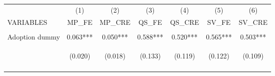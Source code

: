 \begin{center}
\begin{tabular}{lcccccc} \hline
 & (1) & (2) & (3) & (4) & (5) & (6) \\
VARIABLES & MP\_FE & MP\_CRE & QS\_FE & QS\_CRE & SV\_FE & SV\_CRE \\ \hline
\vspace{4pt} & \begin{footnotesize}\end{footnotesize} & \begin{footnotesize}\end{footnotesize} & \begin{footnotesize}\end{footnotesize} & \begin{footnotesize}\end{footnotesize} & \begin{footnotesize}\end{footnotesize} & \begin{footnotesize}\end{footnotesize} \\
Adoption dummy & 0.063*** & 0.050*** & 0.588*** & 0.520*** & 0.565*** & 0.503*** \\
 & \begin{footnotesize}(0.020)\end{footnotesize} & \begin{footnotesize}(0.018)\end{footnotesize} & \begin{footnotesize}(0.133)\end{footnotesize} & \begin{footnotesize}(0.119)\end{footnotesize} & \begin{footnotesize}(0.122)\end{footnotesize} & \begin{footnotesize}(0.109)\end{footnotesize} \\
\vspace{4pt} & \begin{footnotesize}[0.001]\end{footnotesize} & \begin{footnotesize}[0.004]\end{footnotesize} & \begin{footnotesize}[0.000]\end{footnotesize} & \begin{footnotesize}[0.000]\end{footnotesize} & \begin{footnotesize}[0.000]\end{footnotesize} & \begin{footnotesize}[0.000]\end{footnotesize} \\

\end{tabular}
\end{center}
